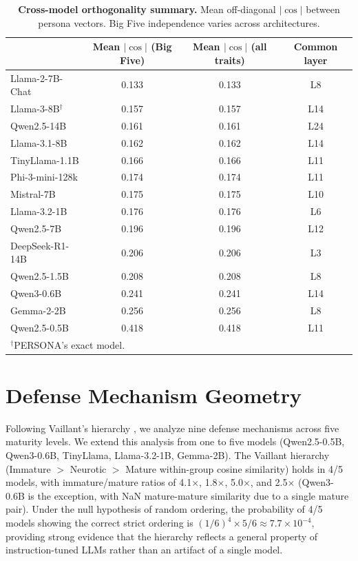 \documentclass{article}
\begin{document}
\begin{table}[h]
\caption{\textbf{Cross-model orthogonality summary.} Mean off-diagonal $|\cos|$ between persona vectors. Big Five independence varies across architectures.}
\label{tab:orthogonality_full}
\centering
\small
\begin{tabular}{lccc}
\toprule
& \textbf{Mean $|\cos|$ (Big Five)} & \textbf{Mean $|\cos|$ (all traits)} & \textbf{Common layer} \\
\midrule
Llama-2-7B-Chat & 0.133 & 0.133 & L8 \\
Llama-3-8B$^\dagger$ & 0.157 & 0.157 & L14 \\
Qwen2.5-14B & 0.161 & 0.161 & L24 \\
Llama-3.1-8B & 0.162 & 0.162 & L14 \\
TinyLlama-1.1B & 0.166 & 0.166 & L11 \\
Phi-3-mini-128k & 0.174 & 0.174 & L11 \\
Mistral-7B & 0.175 & 0.175 & L10 \\
Llama-3.2-1B & 0.176 & 0.176 & L6 \\
Qwen2.5-7B & 0.196 & 0.196 & L12 \\
DeepSeek-R1-14B & 0.206 & 0.206 & L3 \\
Qwen2.5-1.5B & 0.208 & 0.208 & L8 \\
Qwen3-0.6B & 0.241 & 0.241 & L14 \\
Gemma-2-2B & 0.256 & 0.256 & L8 \\
Qwen2.5-0.5B & 0.418 & 0.418 & L11 \\
\bottomrule
\multicolumn{4}{l}{\footnotesize $^\dagger$PERSONA's exact model.}
\end{tabular}
\end{table}

\section{Defense Mechanism Geometry}\label{app:defense}

Following Vaillant's hierarchy \citep{vaillant1986empirical}, we analyze nine defense mechanisms across five maturity levels. We extend this analysis from one to five models (Qwen2.5-0.5B, Qwen3-0.6B, TinyLlama, Llama-3.2-1B, Gemma-2B). The Vaillant hierarchy (Immature $>$ Neurotic $>$ Mature within-group cosine similarity) holds in 4/5 models, with immature/mature ratios of 4.1$\times$, 1.8$\times$, 5.0$\times$, and 2.5$\times$ (Qwen3-0.6B is the exception, with NaN mature-mature similarity due to a single mature pair). Under the null hypothesis of random ordering, the probability of 4/5 models showing the correct strict ordering is $(1/6)^4 \times 5/6 \approx 7.7{\times}10^{-4}$, providing strong evidence that the hierarchy reflects a general property of instruction-tuned LLMs rather than an artifact of a single model.
\end{document}
